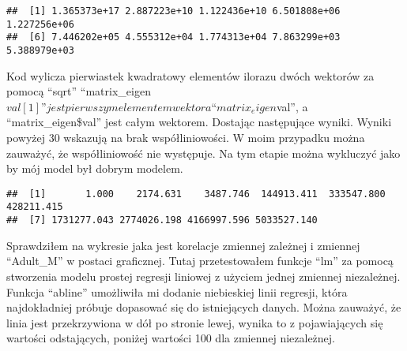 \documentclass[
]{article}
\newenvironment{Shaded}{\begin{snugshade}}{\end{snugshade}}
\newcommand{\AttributeTok}[1]{\textcolor[rgb]{0.77,0.63,0.00}{#1}}
\newcommand{\DecValTok}[1]{\textcolor[rgb]{0.00,0.00,0.81}{#1}}
\newcommand{\FunctionTok}[1]{\textcolor[rgb]{0.00,0.00,0.00}{#1}}
\newcommand{\NormalTok}[1]{#1}
\newcommand{\OtherTok}[1]{\textcolor[rgb]{0.56,0.35,0.01}{#1}}
\newcommand{\SpecialCharTok}[1]{\textcolor[rgb]{0.00,0.00,0.00}{#1}}
\newcommand{\StringTok}[1]{\textcolor[rgb]{0.31,0.60,0.02}{#1}}
\begin{document}
\begin{Shaded}
\end{Shaded}

\begin{verbatim}
##  [1] 1.365373e+17 2.887223e+10 1.122436e+10 6.501808e+06 1.227256e+06
##  [6] 7.446202e+05 4.555312e+04 1.774313e+04 7.863299e+03 5.388979e+03
\end{verbatim}

Kod wylicza pierwiastek kwadratowy elementów ilorazu dwóch wektorów za
pomocą ``sqrt''
``matrix\_eigen\(val[1]” jest pierwszym elementem wektora “matrix_eigen\)val'',
a ``matrix\_eigen\$val'' jest całym wektorem. Dostając następujące
wyniki. Wyniki powyżej 30 wskazują na brak współliniowości. W moim
przypadku można zauważyć, że współliniowość nie występuje. Na tym etapie
można wykluczyć jako by mój model był dobrym modelem.

\begin{Shaded}
\end{Shaded}

\begin{verbatim}
##  [1]       1.000    2174.631    3487.746  144913.411  333547.800  428211.415
##  [7] 1731277.043 2774026.198 4166997.596 5033527.140
\end{verbatim}

Sprawdziłem na wykresie jaka jest korelacje zmiennej zależnej i zmiennej
``Adult\_M'' w postaci graficznej. Tutaj przetestowałem funkcje ``lm''
za pomocą stworzenia modelu prostej regresji liniowej z użyciem jednej
zmiennej niezależnej. Funkcja ``abline'' umożliwiła mi dodanie
niebieskiej linii regresji, która najdokładniej próbuje dopasować się do
istniejących danych. Można zauważyć, że linia jest przekrzywiona w dół
po stronie lewej, wynika to z pojawiających się wartości odstających,
poniżej wartości 100 dla zmiennej niezależnej.

\begin{Shaded}
\end{Shaded}
\end{document}
